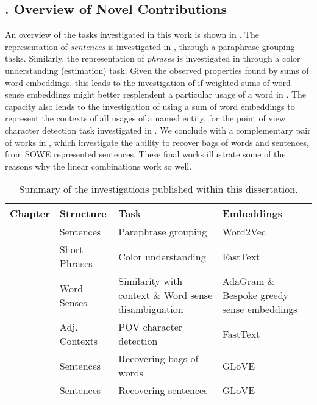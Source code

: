 \documentclass{book}
\begin{document}
\subsection*{. Overview of Novel Contributions}
An overview of the tasks investigated in this work is shown in .
The representation of \emph{sentences} is investigated in , through a paraphrase grouping tasks.
Similarly, the representation of \emph{phrases} is investigated in  through a color understanding (estimation) task.
Given the observed properties found by sums of word embeddings,
this leads to the investigation of if weighted sums of word sense embeddings might better resplendent a particular usage of a word in .
The capacity also lends to the investigation of using a sum of word embeddings to represent the contexts of all usages of a named entity, for the point of view character detection task investigated in .
We conclude with a complementary pair of works in  , which investigate the ability to recover bags of words and sentences, from SOWE represented sentences.
These final works illustrate some of the reasons why the linear combinations work so well.

\begin{table}
	\begin{tabularx}{\textwidth}{llXX}
		\toprule
		\textbf{Chapter} & \textbf{Structure} & Task & \textbf{Embeddings}\\
		\midrule
		\Cref{SentVecMeaning}  & Sentences & Paraphrase grouping &  Word2Vec \citep{mikolovSkip}\\
		\Cref{ColorEst} & Short Phrases & Color understanding & FastText \citep{bojanowski2016enriching}\\
		\Cref{RefittingSenses} & Word Senses & Similarity with context \& Word sense disambiguation %
			& AdaGram \citep{AdaGrams} \& Bespoke greedy sense embeddings\\
		\Cref{NovelPerspective} & Adj. Contexts & POV character detection & FastText \citep{bojanowski2016enriching}\\
		\Cref{BOWgen} & Sentences & Recovering bags of words & GLoVE \citep{pennington2014glove} \\
		\Cref{SOWE2Sent} & Sentences & Recovering sentences & GLoVE \citep{pennington2014glove} \\
		\bottomrule
	\end{tabularx}
	\caption{Summary of the investigations published within this dissertation. \label{tbl:methodsandtasks}}
\end{table}
\end{document}
